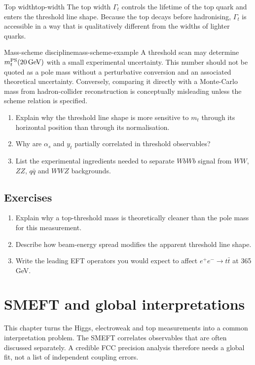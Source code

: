 \documentclass[11pt,a4paper]{article}
\newcommand{\GeV}{\mathrm{GeV}}
\numberwithin{equation}{section}
\begin{document}
\begin{definition}{Top width}{top-width}
The top width \(\Gamma_t\) controls the lifetime of the top quark and enters the threshold line shape. Because the top decays before hadronising, \(\Gamma_t\) is accessible in a way that is qualitatively different from the widths of lighter quarks.
\end{definition}

\begin{examplebox}{Mass-scheme discipline}{mass-scheme-example}
A threshold scan may determine \(m_t^{\rm PS}(20\,\GeV)\) with a small experimental uncertainty. This number should not be quoted as a pole mass without a perturbative conversion and an associated theoretical uncertainty. Conversely, comparing it directly with a Monte-Carlo mass from hadron-collider reconstruction is conceptually misleading unless the scheme relation is specified.
\end{examplebox}

\begin{guidedchecksbox}
\begin{enumerate}[leftmargin=1.6em]
\item Explain why the threshold line shape is more sensitive to \(m_t\) through its horizontal position than through its normalisation.
\item Why are \(\alpha_s\) and \(y_t\) partially correlated in threshold observables?
\item List the experimental ingredients needed to separate \(WbWb\) signal from \(WW\), \(ZZ\), \(q\bar q\) and \(WWZ\) backgrounds.
\end{enumerate}
\end{guidedchecksbox}

\subsection{Exercises}
\begin{enumerate}[leftmargin=1.6em]
\item Explain why a top-threshold mass is theoretically cleaner than the pole mass for this measurement.
\item Describe how beam-energy spread modifies the apparent threshold line shape.
\item Write the leading EFT operators you would expect to affect \(e^+e^-\to t\bar t\) at 365 GeV.
\end{enumerate}


\newpage
\section{SMEFT and global interpretations}
\begin{guidelinebox}
This chapter turns the Higgs, electroweak and top measurements into a common interpretation problem. The SMEFT correlates observables that are often discussed separately. A credible FCC precision analysis therefore needs a global fit, not a list of independent coupling errors.
\end{guidelinebox}
\end{document}

